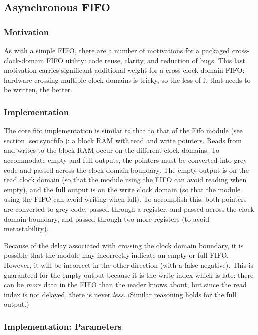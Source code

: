 \documentclass[10pt]{report}
\begin{document}
\subsection{Asynchronous FIFO}

\label{sec:fifo}

\subsubsection{Motivation}

As with a simple FIFO, there are a number of motivations for a packaged
cross-clock-domain FIFO utility: code reuse, clarity, and reduction of bugs.
This last motivation carries significant additional weight for a
cross-clock-domain FIFO: hardware crossing multiple clock domains is tricky,
so the less of it that needs to be written, the better.

\subsubsection{Implementation}

The core fifo implementation is similar to that to that of the Fifo module
(see section \ref{sec:syncfifo}): a block RAM with read and write
pointers.  Reads from and writes to the block RAM occur on the different
clock domains.  To accommodate empty and full outputs, the pointers must be
converted into grey code and passed across the clock domain boundary.  The
empty output is on the read clock domain (so that the module using the FIFO
can avoid reading when empty), and the full output is on the write clock
domain (so that the module using the FIFO can avoid writing when full).  To
accomplish this, both pointers are converted to grey code, passed through a
register, and passed across the clock domain boundary, and passed through
two more registers (to avoid metastability).

Because of the delay associated with crossing the clock domain boundary, it
is possible that the module may incorrectly indicate an empty or full FIFO. 
However, it will be incorrect in the other direction (with a false
negative).  This is guaranteed for the empty output because it is the write
index which is late: there can be \textit{more} data in the FIFO than the
reader knows about, but since the read index is not delayed, there is never
\textit{less}.  (Similar reasoning holds for the full output.)

\subsubsection{Implementation: Parameters}
\end{document}

